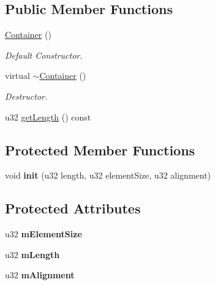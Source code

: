 \subsection*{Public Member Functions}
\begin{DoxyCompactItemize}
\item 
\hyperlink{classDE_1_1Container_a21e341b2726d98cd8de87b2804c4b0ea}{Container} ()\hypertarget{classDE_1_1Container_a21e341b2726d98cd8de87b2804c4b0ea}{}\label{classDE_1_1Container_a21e341b2726d98cd8de87b2804c4b0ea}

\begin{DoxyCompactList}\small\item\em Default Constructor. \end{DoxyCompactList}\item 
virtual \hyperlink{classDE_1_1Container_aa22155e6b8843498914f90c38154a1dd}{$\sim$\+Container} ()\hypertarget{classDE_1_1Container_aa22155e6b8843498914f90c38154a1dd}{}\label{classDE_1_1Container_aa22155e6b8843498914f90c38154a1dd}

\begin{DoxyCompactList}\small\item\em Destructor. \end{DoxyCompactList}\item 
u32 \hyperlink{classDE_1_1Container_ac4e1b4aefaecda0e225312fe463c9995}{get\+Length} () const 
\end{DoxyCompactItemize}
\subsection*{Protected Member Functions}
\begin{DoxyCompactItemize}
\item 
void {\bfseries init} (u32 length, u32 element\+Size, u32 alignment)\hypertarget{classDE_1_1Container_a74ee311792f00a7fb3d07d8a0fe6c161}{}\label{classDE_1_1Container_a74ee311792f00a7fb3d07d8a0fe6c161}

\end{DoxyCompactItemize}
\subsection*{Protected Attributes}
\begin{DoxyCompactItemize}
\item 
u32 {\bfseries m\+Element\+Size}\hypertarget{classDE_1_1Container_aa644444a2ab6f47a2f23a24fc3735022}{}\label{classDE_1_1Container_aa644444a2ab6f47a2f23a24fc3735022}

\item 
u32 {\bfseries m\+Length}\hypertarget{classDE_1_1Container_acde96d5b0bd1bd51c64b762b77b81fbb}{}\label{classDE_1_1Container_acde96d5b0bd1bd51c64b762b77b81fbb}

\item 
u32 {\bfseries m\+Alignment}\hypertarget{classDE_1_1Container_af34003e0c91ad31e4d744d3b9f4bb7c1}{}\label{classDE_1_1Container_af34003e0c91ad31e4d744d3b9f4bb7c1}

\end{DoxyCompactItemize}
